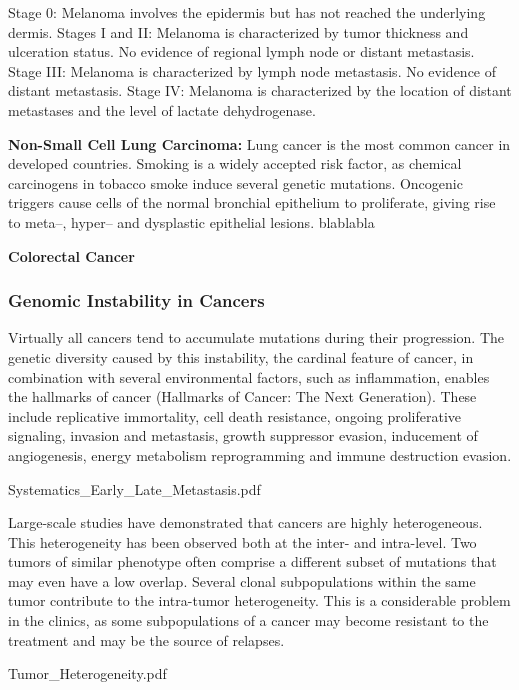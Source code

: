     Stage 0: Melanoma involves the epidermis but has not reached the underlying dermis.
    Stages I and II: Melanoma is characterized by tumor thickness and ulceration status. No evidence of regional lymph node or distant metastasis.
    Stage III: Melanoma is characterized by lymph node metastasis. No evidence of distant metastasis.
    Stage IV: Melanoma is characterized by the location of distant metastases and the level of lactate dehydrogenase.


    \textbf{Non-Small Cell Lung Carcinoma:} Lung cancer is the most common
    cancer in developed countries. Smoking is a widely accepted risk factor, as
    chemical carcinogens in tobacco smoke induce several genetic mutations.
    Oncogenic triggers cause cells of the normal bronchial epithelium to
    proliferate, giving rise to meta--, hyper-- and dysplastic epithelial
    lesions. blablabla


    \textbf{Colorectal Cancer}

    \subsubsection{Genomic Instability in Cancers}

      Virtually all cancers tend to accumulate mutations during their progression.
      The genetic diversity caused by this instability, the cardinal feature of
      cancer, in combination with several environmental factors, such as
      inflammation, enables the hallmarks of cancer (Hallmarks of Cancer: The Next
      Generation). These include replicative immortality, cell death resistance,
      ongoing proliferative signaling, invasion and metastasis, growth suppressor
      evasion, inducement of angiogenesis, energy metabolism reprogramming and
      immune destruction evasion.

Systematics_Early_Late_Metastasis.pdf

      Large-scale studies have demonstrated that cancers are highly heterogeneous.
      This heterogeneity has been observed both at the inter- and intra-level. Two
      tumors of similar phenotype often comprise a different subset of mutations
      that may even have a low overlap. Several clonal subpopulations within the
      same tumor contribute to the intra-tumor heterogeneity. This is a
      considerable problem in the clinics, as some subpopulations of a cancer may
      become resistant to the  treatment and may be the source of relapses.

Tumor_Heterogeneity.pdf

